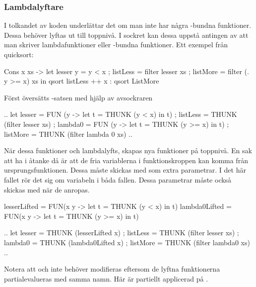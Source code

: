 \documentclass[../Core]{subfiles}
\begin{document}
\subsubsection{Lambdalyftare}

I tolkandet av koden underlättar det om man inte har några -bundna funktioner.
Dessa behöver lyftas ut till toppnivå. I sockret kan dessa uppstå antingen
av att man skriver lambdafunktioner eller -bundna funktioner. Ett exempel
från quicksort:

\begin{codeEx}
  Cons x xs ->
      let { lesser y = y < x
          ; listLess = filter lesser xs
          ; listMore = filter (\y . y >= x) xs
          }
      in  qsort listLess ++ x : qsort ListMore
\end{codeEx}

Först översätts -satsen med hjälp av avsockraren

\begin{codeEx}
  .. let { lesser = FUN (y -> let t = THUNK (y < x) in t)
         ; listLess = THUNK (filter lesser xs)
         ; lambda0 = FUN (y -> let t = THUNK (y >= x) in t)
         ; listMore = THUNK (filter lambda 0 xs)
         } ..
\end{codeEx}
      
När dessa funktioner  och  lambdalyfts, skapas nya funktioner
på toppnivå. En sak att ha i åtanke då är att de fria variablerna i funktionskroppen 
kan komma från ursprungsfunktionen. Dessa måste skickas med
som extra parametrar. I det här fallet rör det sig om variabeln  i båda fallen.
Dessa parametrar måste också skickas med när de anropas.
\begin{codeEx}
lesserLifted  = FUN(x y -> let t = THUNK (y <  x) in t)
lambda0Lifted = FUN(x y -> let t = THUNK (y >= x) in t)

    .. let { lesser   = THUNK (lesserLifted   x)
           ; listLess = THUNK (filter lesser  xs)
           ; lambda0  = THUNK (lambda0Lifted  x)
           ; listMore = THUNK (filter lambda0 xs)
           } ..
\end{codeEx}

Notera att  och  
inte behöver modifieras eftersom de lyftna funktionerna partialevalueras 
med samma namn. Här är  
partiellt applicerad på .
\end{document}
